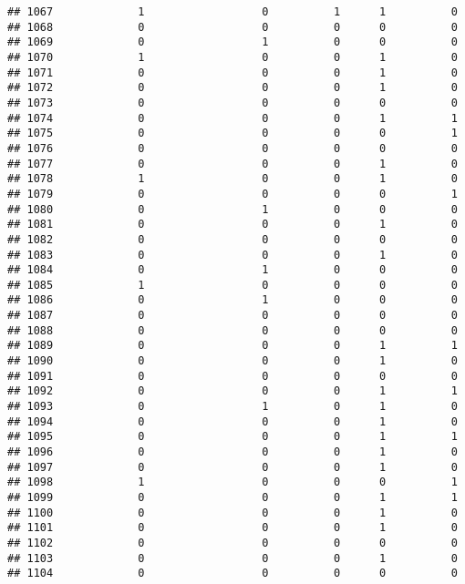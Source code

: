 \documentclass[
]{article}
\begin{document}
\begin{verbatim}
## 1067             1                  0          1      1          0
## 1068             0                  0          0      0          0
## 1069             0                  1          0      0          0
## 1070             1                  0          0      1          0
## 1071             0                  0          0      1          0
## 1072             0                  0          0      1          0
## 1073             0                  0          0      0          0
## 1074             0                  0          0      1          1
## 1075             0                  0          0      0          1
## 1076             0                  0          0      0          0
## 1077             0                  0          0      1          0
## 1078             1                  0          0      1          0
## 1079             0                  0          0      0          1
## 1080             0                  1          0      0          0
## 1081             0                  0          0      1          0
## 1082             0                  0          0      0          0
## 1083             0                  0          0      1          0
## 1084             0                  1          0      0          0
## 1085             1                  0          0      0          0
## 1086             0                  1          0      0          0
## 1087             0                  0          0      0          0
## 1088             0                  0          0      0          0
## 1089             0                  0          0      1          1
## 1090             0                  0          0      1          0
## 1091             0                  0          0      0          0
## 1092             0                  0          0      1          1
## 1093             0                  1          0      1          0
## 1094             0                  0          0      1          0
## 1095             0                  0          0      1          1
## 1096             0                  0          0      1          0
## 1097             0                  0          0      1          0
## 1098             1                  0          0      0          1
## 1099             0                  0          0      1          1
## 1100             0                  0          0      1          0
## 1101             0                  0          0      1          0
## 1102             0                  0          0      0          0
## 1103             0                  0          0      1          0
## 1104             0                  0          0      0          0

\end{verbatim}
\end{document}
